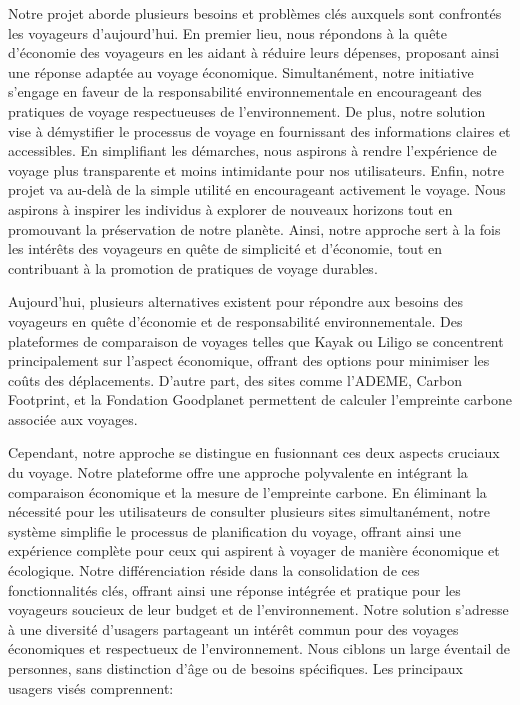 \documentclass[mstat,12pt]{unswthesis}
\begin{document}
\begin{adjustwidth}{-2cm}{}
Notre projet aborde plusieurs besoins et problèmes clés auxquels sont
confrontés les voyageurs d'aujourd'hui. En premier lieu, nous répondons
à la quête d'économie des voyageurs en les aidant à réduire leurs
dépenses, proposant ainsi une réponse adaptée au voyage économique.
Simultanément, notre initiative s'engage en faveur de la responsabilité
environnementale en encourageant des pratiques de voyage respectueuses
de l'environnement. De plus, notre solution vise à démystifier le
processus de voyage en fournissant des informations claires et
accessibles. En simplifiant les démarches, nous aspirons à rendre
l'expérience de voyage plus transparente et moins intimidante pour nos
utilisateurs. Enfin, notre projet va au-delà de la simple utilité en
encourageant activement le voyage. Nous aspirons à inspirer les
individus à explorer de nouveaux horizons tout en promouvant la
préservation de notre planète. Ainsi, notre approche sert à la fois les
intérêts des voyageurs en quête de simplicité et d'économie, tout en
contribuant à la promotion de pratiques de voyage durables.

Aujourd'hui, plusieurs alternatives existent pour répondre aux besoins
des voyageurs en quête d'économie et de responsabilité environnementale.
Des plateformes de comparaison de voyages telles que Kayak ou Liligo se
concentrent principalement sur l'aspect économique, offrant des options
pour minimiser les coûts des déplacements. D'autre part, des sites comme
l'ADEME, Carbon Footprint, et la Fondation Goodplanet permettent de
calculer l'empreinte carbone associée aux voyages.

Cependant, notre approche se distingue en fusionnant ces deux aspects
cruciaux du voyage. Notre plateforme offre une approche polyvalente en
intégrant la comparaison économique et la mesure de l'empreinte carbone.
En éliminant la nécessité pour les utilisateurs de consulter plusieurs
sites simultanément, notre système simplifie le processus de
planification du voyage, offrant ainsi une expérience complète pour ceux
qui aspirent à voyager de manière économique et écologique. Notre
différenciation réside dans la consolidation de ces fonctionnalités
clés, offrant ainsi une réponse intégrée et pratique pour les voyageurs
soucieux de leur budget et de l'environnement. Notre solution s'adresse
à une diversité d'usagers partageant un intérêt commun pour des voyages
économiques et respectueux de l'environnement. Nous ciblons un large
éventail de personnes, sans distinction d'âge ou de besoins spécifiques.
Les principaux usagers visés comprennent:


\end{adjustwidth}
\end{document}
